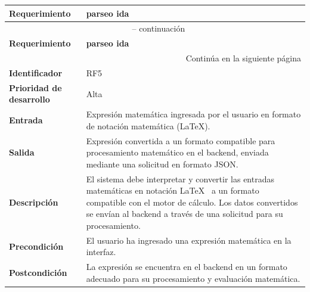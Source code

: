 \begin{longtable}{|m{3.5cm}|m{9.5cm}|}
	\hline
	\rowcolor{black!75} \color{white}\textbf{Requerimiento} & \color{white}\textbf{parseo ida} \\
	\hline
	\endfirsthead
	\multicolumn{2}{c}{{\tablename\ \thetable{} -- continuación}} \\
	\hline
	\rowcolor{black!75} \color{white}\textbf{Requerimiento} & \color{white}\textbf{parseo ida} \\
	\hline
	\endhead
	\hline \multicolumn{2}{r}{{Continúa en la siguiente página}} \\
	\endfoot
	\hline
	\endlastfoot
	
	\textbf{Identificador} & RF5 \\
	\hline
	\textbf{Prioridad de desarrollo} & Alta \\
	\hline
	\textbf{Entrada} & Expresión matemática ingresada por el usuario en formato de notación matemática (\LaTeX). \\
	\hline
	\textbf{Salida} & Expresión convertida a un formato compatible para procesamiento matemático en el backend, enviada mediante una solicitud en formato JSON. \\
	\hline
	\textbf{Descripción} & El sistema debe interpretar y convertir las entradas matemáticas en notación \LaTeX~ a un formato compatible con el motor de cálculo. Los datos convertidos se envían al backend a través de una solicitud para su procesamiento. \\
	\hline
	\textbf{Precondición} & El usuario ha ingresado una expresión matemática en la interfaz. \\
	\hline
	\textbf{Postcondición} & La expresión se encuentra en el backend en un formato adecuado para su procesamiento y evaluación matemática. \\
	\hline
\end{longtable}
\caption{Requerimiento funcional No. 5} \label{tabla:RF5}
\vspace{0.5cm}

